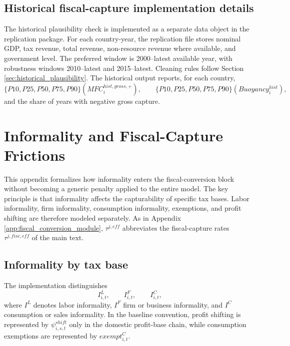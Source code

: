 \documentclass[11pt,a4paper]{article}
\begin{document}
\subsection{Historical fiscal-capture implementation details}

The historical plausibility check is implemented as a separate data object in the replication package. For each country-year, the replication file stores nominal GDP, tax revenue, total revenue, non-resource revenue where available, and government level. The preferred window is 2000--latest available year, with robustness windows 2010--latest and 2015--latest. Cleaning rules follow Section \ref{sec:historical_plausibility}. The historical output reports, for each country,
\begin{equation}
    \{P10,P25,P50,P75,P90\}\left(MFC^{hist,gross,+}_i\right),
    \qquad
    \{P10,P25,P50,P75,P90\}\left(Buoyancy^{hist}_i\right),
\end{equation}
and the share of years with negative gross capture.


\section{Informality and Fiscal-Capture Frictions}\label{app:informality_module}

This appendix formalizes how informality enters the fiscal-conversion block without becoming a generic penalty applied to the entire model. The key principle is that informality affects the capturability of specific tax bases. Labor informality, firm informality, consumption informality, exemptions, and profit shifting are therefore modeled separately. As in Appendix \ref{app:fiscal_conversion_module}, $\tau^{j,eff}$ abbreviates the fiscal-capture rates $\tau^{j,fisc,eff}$ of the main text.

\subsection{Informality by tax base}

The implementation distinguishes
\begin{equation}
    I^L_{i,t},\qquad I^F_{i,t},\qquad I^C_{i,t},
\end{equation}
where $I^L$ denotes labor informality, $I^F$ firm or business informality, and $I^C$ consumption or sales informality. In the baseline convention, profit shifting is represented by $\psi^{shift}_{i,s,t}$ only in the domestic profit-base chain, while consumption exemptions are represented by $exempt^C_{i,t}$.
\end{document}
